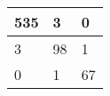 \begin{tabular}{lll}
\hline
  535 & 3 & 0 \\
\hline
  3 & 98 & 1 \\
\hline
  0 & 1 & 67 \\
\hline
\end{tabular}
